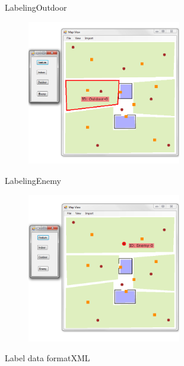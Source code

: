 \begin{frame}{Labeling}{Outdoor}

\begin{figure}
\centering
\includegraphics[width = 0.6\textwidth]{./screenshot/outdoor_label.png}
\end{figure}

\end{frame}

\begin{frame}{Labeling}{Enemy}

\begin{figure}
\centering
\includegraphics[width = 0.6\textwidth]{./screenshot/enemy_label.png}
\end{figure}

\end{frame}

\begin{frame}{Label data format}{XML}



\end{frame}